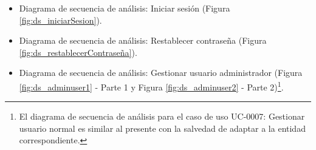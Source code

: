 \documentclass[12pt,a4paper, twoside]{report}
\begin{document}
\begin{itemize}
		\newpage
		
		\item Diagrama de secuencia de análisis: Iniciar sesión (Figura \ref{fig:ds_iniciarSesion}).
		

		\newpage
		
		\item Diagrama de secuencia de análisis: Restablecer contraseña (Figura \ref{fig:ds_restablecerContraseña}).
		
		
		\newpage
		
		\item Diagrama de secuencia de análisis: Gestionar usuario administrador (Figura \ref{fig:ds_adminuser1} - Parte 1 y Figura \ref{fig:ds_adminuser2} - Parte 2)\footnote{El diagrama de secuencia de análisis para el caso de uso UC-0007: Gestionar usuario normal es similar al presente con la salvedad de adaptar a la entidad correspondiente.}.
		
		
		\newpage
		

\end{itemize}
\end{document}
